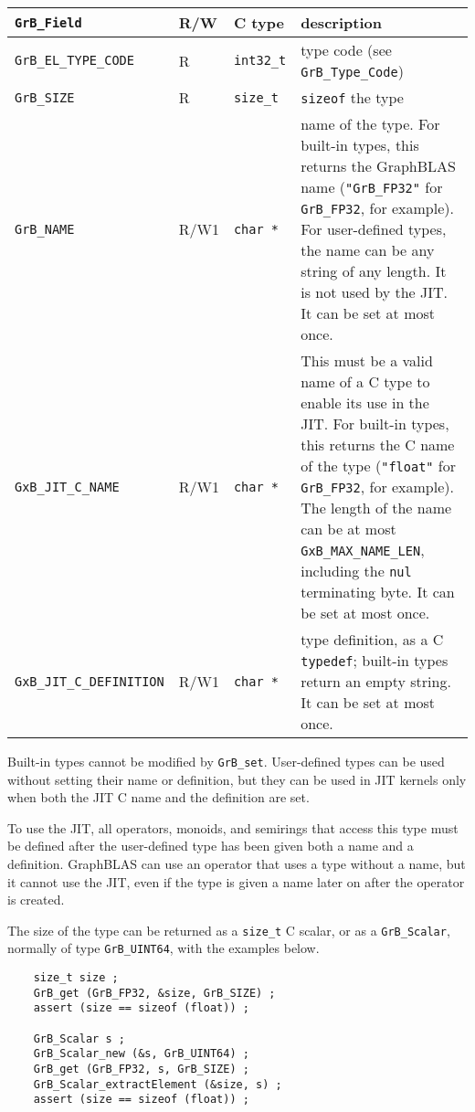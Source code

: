 \noindent
{\small
\begin{tabular}{|l|l|l|p{2.85in}|}
\hline
\verb'GrB_Field'                    & R/W  & C type        & description \\
\hline
\verb'GrB_EL_TYPE_CODE'             & R    & \verb'int32_t'& type code (see \verb'GrB_Type_Code') \\
\verb'GrB_SIZE'                     & R    & \verb'size_t' & \verb'sizeof' the type \\
\hline
\verb'GrB_NAME'                     & R/W1 & \verb'char *' &    %
    name of the type.  For built-in types, this returns the GraphBLAS
    name (\verb'"GrB_FP32"' for \verb'GrB_FP32', for example).
    For user-defined types, the name can be any string of any length.  It is
    not used by the JIT.  It can be set at most once. \\
\verb'GxB_JIT_C_NAME'               & R/W1 & \verb'char *' & 
    This must be a valid name of a C type to enable its use in the JIT.  For
    built-in types, this returns the C name of the type (\verb'"float"' for
    \verb'GrB_FP32', for example). The length of the name can be at most
    \verb'GxB_MAX_NAME_LEN', including the \verb'nul' terminating byte.  It can
    be set at most once. \\
\verb'GxB_JIT_C_DEFINITION'               & R/W1 & \verb'char *' &
    type definition, as a C \verb'typedef';
    built-in types return an empty string. 
    It can be set at most once. \\
\hline
\end{tabular}
}

Built-in types cannot be modified by \verb'GrB_set'.  User-defined types can be
used without setting their name or definition, but they can be used in JIT
kernels only when both the JIT C name and the definition are set.

To use the JIT, all operators, monoids, and semirings that access this type
must be defined after the user-defined type has been given both a name and a
definition.  GraphBLAS can use an operator that uses a type without a name,
but it cannot use the JIT, even if the type is given a name later on after
the operator is created.

The size of the type can be returned as a \verb'size_t' C scalar, or as a
\verb'GrB_Scalar', normally of type \verb'GrB_UINT64', with the examples below.

{\footnotesize
\begin{verbatim}
    size_t size ;
    GrB_get (GrB_FP32, &size, GrB_SIZE) ;
    assert (size == sizeof (float)) ;

    GrB_Scalar s ;
    GrB_Scalar_new (&s, GrB_UINT64) ;
    GrB_get (GrB_FP32, s, GrB_SIZE) ;
    GrB_Scalar_extractElement (&size, s) ;
    assert (size == sizeof (float)) ; \end{verbatim}}

